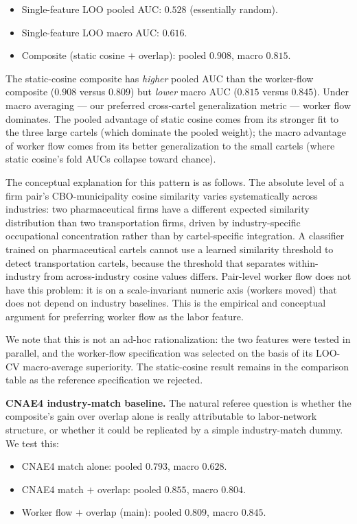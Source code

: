 \begin{itemize}
\item Single-feature LOO pooled AUC: $0.528$ (essentially random).
\item Single-feature LOO macro AUC: $0.616$.
\item Composite (static cosine $+$ overlap): pooled $0.908$, macro $0.815$.
\end{itemize}

The static-cosine composite has \emph{higher} pooled AUC than the worker-flow composite ($0.908$ versus $0.809$) but \emph{lower} macro AUC ($0.815$ versus $0.845$). Under macro averaging --- our preferred cross-cartel generalization metric --- worker flow dominates. The pooled advantage of static cosine comes from its stronger fit to the three large cartels (which dominate the pooled weight); the macro advantage of worker flow comes from its better generalization to the small cartels (where static cosine's fold AUCs collapse toward chance).

The conceptual explanation for this pattern is as follows. The absolute level of a firm pair's CBO-municipality cosine similarity varies systematically across industries: two pharmaceutical firms have a different expected similarity distribution than two transportation firms, driven by industry-specific occupational concentration rather than by cartel-specific integration. A classifier trained on pharmaceutical cartels cannot use a learned similarity threshold to detect transportation cartels, because the threshold that separates within-industry from across-industry cosine values differs. Pair-level worker flow does not have this problem: it is on a scale-invariant numeric axis (workers moved) that does not depend on industry baselines. This is the empirical and conceptual argument for preferring worker flow as the labor feature.

We note that this is not an ad-hoc rationalization: the two features were tested in parallel, and the worker-flow specification was selected on the basis of its LOO-CV macro-average superiority. The static-cosine result remains in the comparison table as the reference specification we rejected.

\textbf{CNAE4 industry-match baseline.} The natural referee question is whether the composite's gain over overlap alone is really attributable to labor-network structure, or whether it could be replicated by a simple industry-match dummy. We test this:

\begin{itemize}
\item CNAE4 match alone: pooled $0.793$, macro $0.628$.
\item CNAE4 match $+$ overlap: pooled $0.855$, macro $0.804$.
\item Worker flow $+$ overlap (main): pooled $0.809$, macro $0.845$.
\end{itemize}

